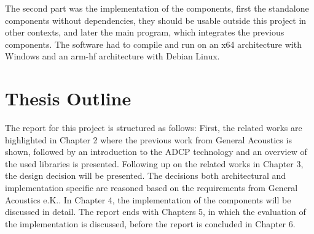 The second part was the implementation of the components, first the standalone components without dependencies, they should be usable outside this project in other contexts, and later the main program, which integrates the previous components. The software had to compile and run on an x64 architecture with Windows and an arm-hf architecture with Debian Linux.

\section{Thesis Outline}
The report for this project is structured as follows: First, the related works are highlighted in Chapter 2 where the previous work from General Acoustics is shown, followed by an introduction to the ADCP technology and an overview of the used libraries is presented. Following up on the related works in Chapter 3, the design decision will be presented. The decisions both architectural and implementation specific are reasoned based on the requirements from General Acoustics e.K.. In Chapter 4, the implementation of the components will be discussed in detail. The report ends with Chapters 5, in which the evaluation of the implementation is discussed, before the report is concluded in Chapter 6.
